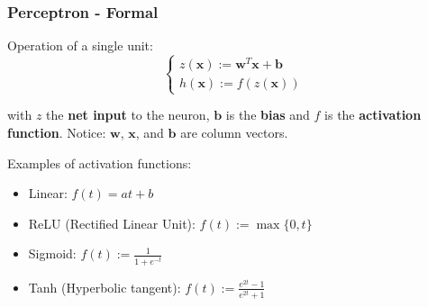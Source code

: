\documentclass{beamer}
\begin{document}

	

	\begin{frame}
		\frametitle{Perceptron - Formal}

		Operation of a single unit:
		\begin{equation*}
			\begin{cases}
				z(\bm{x}) := \bm{w}^T \bm{x} + \bm{b}\\
				h(\bm{x}) := f(z(\bm{x}))
			\end{cases}
		\end{equation*}
	
		with $z$  the \textbf{net input} to the neuron, $ \bm{b}$ is the \textbf{bias} and $f$ is the \textbf{activation function}. Notice: $\bm{w}$, $\bm{x}$, and $\bm{b}$ are column vectors.
		
		\vspace{5mm}
		
		Examples of activation functions:
		\begin{itemize}
			\item Linear:  $f(t) = at + b$
			\item ReLU (Rectified Linear Unit): $f(t) := \max\{0, t\}$
			\item Sigmoid: $f(t) := \frac{1}{1 + e^{-t}}$
			\item Tanh (Hyperbolic tangent): $f(t) := \frac{e^{2t}-1}{e^{2t}+1}$
		\end{itemize}
		
	\end{frame}
	
\end{document}
